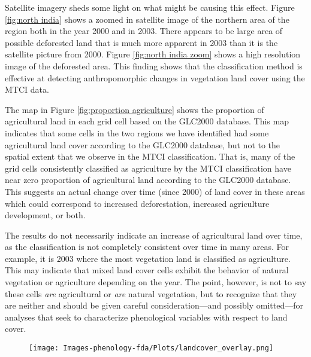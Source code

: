 Satellite imagery sheds some light on what might be causing this effect. Figure \ref{fig:north india} shows a zoomed in satellite image of the northern area of the region both in the year 2000 and in 2003. There appears to be large area of possible deforested land that is much more apparent in 2003 than it is the satellite picture from 2000. Figure \ref{fig:north india zoom} shows a high resolution image of the deforested area. This finding shows that the classification method is effective at detecting anthropomorphic changes in vegetation land cover using the MTCI data. 

The map in Figure \ref{fig:proportion agriculture} shows the proportion of agricultural land in each grid cell based on the GLC2000 database. This map indicates that some cells in the two regions we have identified had some agricultural land cover according to the GLC2000 database, but not to the spatial extent that we observe in the MTCI classification. That is, many of the grid cells consistently classified as agriculture by the MTCI classification have near zero proportion of agricultural land according to the GLC2000 database. This suggests an actual change over time (since 2000) of land cover in these areas which could correspond to increased deforestation, increased agriculture development, or both. 

The results do not necessarily indicate an increase of agricultural land over time, as the classification is not completely consistent over time in many areas. For example, it is 2003 where the most vegetation land is classified as agriculture. This may indicate that mixed land cover cells exhibit the behavior of natural vegetation or agriculture depending on the year. The point, however, is not to say these cells \emph{are} agricultural or \emph{are} natural vegetation, but to recognize that they are neither and should be given careful consideration---and possibly omitted---for analyses that seek to characterize phenological variables with respect to land cover. 


\label{sec:discussion}


\begin{figure}
	[htbp] \centering 
	\texttt{[image: Images-phenology-fda/Plots/landcover\_overlay.png]} \\
	\label{fig:classification overlay} 
\end{figure}

